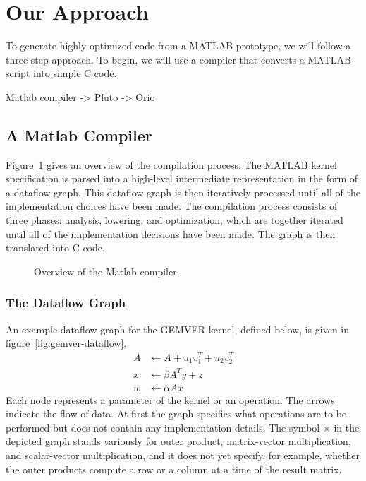 \documentclass[11pt]{article}
\begin{document}
\section{Our Approach}
\label{sec:approach}

To generate highly optimized code from a MATLAB prototype, we will follow a three-step approach.    To begin, we will use a compiler that converts a MATLAB script into simple C code.  

Matlab compiler -> Pluto ->  Orio

\subsection{A Matlab Compiler}
\label{sec:matlab}

Figure~\ref{fig:compiler} gives an overview of the compilation process. The MATLAB kernel specification is parsed into a high-level intermediate representation in the form of a dataflow graph.  This dataflow graph is then iteratively processed until all of the implementation choices have been made.  The compilation process consists of three phases: analysis, lowering, and optimization, which are together iterated until all of the implementation decisions have been made.  The graph is then translated into C code.

\begin{figure}[htbp]
  \centering

  \caption{Overview of the Matlab compiler.}
\label{fig:compiler}
\end{figure}


\subsubsection{The Dataflow Graph}

An example dataflow graph for the GEMVER kernel, defined below, is given in figure~\ref{fig:gemver-dataflow}.
\begin{eqnarray*}
  A &\gets A + u_1 v_1^T + u_2 v_2^T \\[-0.5ex]
  x &\gets \beta A^T y + z \\[-0.5ex]
  w &\gets \alpha A x
\end{eqnarray*}
Each node represents a parameter of the kernel or an operation.  The arrows indicate the flow of data. At first the graph specifies what operations are to be performed but does not contain any implementation details. The symbol $\times$ in the depicted graph stands variously for outer product, matrix-vector multiplication, and scalar-vector multiplication, and it does not yet specify, for example, whether the outer products compute a row or a column at a time of the result matrix.
\end{document}
